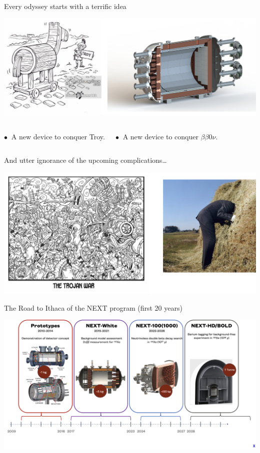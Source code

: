 \documentclass [aspectratio=169]{beamer}
\newcommand{\bbonu}{\ensuremath{\beta\beta0\nu}}
\begin{document}
\begin{frame}{Every odyssey starts with a terrific idea}

\includegraphics[scale=0.26]{odysseystart.png}

\begin{columns}

$\bullet~$ A new device to conquer Troy.  

$\bullet~$ A new device to conquer \bbonu.

\end{columns}

\end{frame}

\begin{frame}{And utter ignorance of the upcoming complications…}

\includegraphics[scale=0.45]{complications.png}

\end{frame}

\begin{frame}{The Road to Ithaca of the NEXT program (first 20 years)}

\includegraphics[scale=0.23]{nextprogram.png}

\end{frame}
\end{document}
